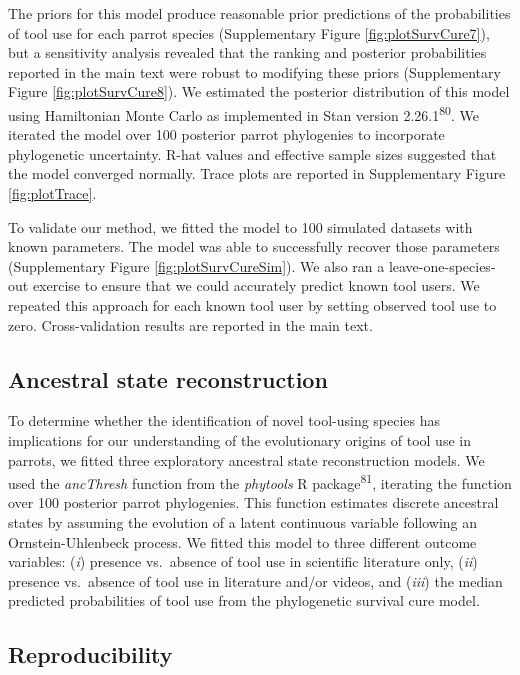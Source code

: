 \documentclass[
  man,floatsintext]{apa6}
\begin{document}
The priors for this model produce reasonable prior predictions of the probabilities of tool use for each parrot species (Supplementary Figure \ref{fig:plotSurvCure7}), but a sensitivity analysis revealed that the ranking and posterior probabilities reported in the main text were robust to modifying these priors (Supplementary Figure \ref{fig:plotSurvCure8}). We estimated the posterior distribution of this model using Hamiltonian Monte Carlo as implemented in Stan version 2.26.1\textsuperscript{80}. We iterated the model over 100 posterior parrot phylogenies to incorporate phylogenetic uncertainty. R-hat values and effective sample sizes suggested that the model converged normally. Trace plots are reported in Supplementary Figure \ref{fig:plotTrace}.

To validate our method, we fitted the model to 100 simulated datasets with known parameters. The model was able to successfully recover those parameters (Supplementary Figure \ref{fig:plotSurvCureSim}). We also ran a leave-one-species-out exercise to ensure that we could accurately predict known tool users. We repeated this approach for each known tool user by setting observed tool use to zero. Cross-validation results are reported in the main text.

\hypertarget{ancestral-state-reconstruction}{%
\subsection{Ancestral state reconstruction}\label{ancestral-state-reconstruction}}

To determine whether the identification of novel tool-using species has implications for our understanding of the evolutionary origins of tool use in parrots, we fitted three exploratory ancestral state reconstruction models. We used the \emph{ancThresh} function from the \emph{phytools} R package\textsuperscript{81}, iterating the function over 100 posterior parrot phylogenies. This function estimates discrete ancestral states by assuming the evolution of a latent continuous variable following an Ornstein-Uhlenbeck process. We fitted this model to three different outcome variables: (\emph{i}) presence vs.~absence of tool use in scientific literature only, (\emph{ii}) presence vs.~absence of tool use in literature and/or videos, and (\emph{iii}) the median predicted probabilities of tool use from the phylogenetic survival cure model.

\hypertarget{reproducibility}{%
\subsection{Reproducibility}\label{reproducibility}}
\end{document}
